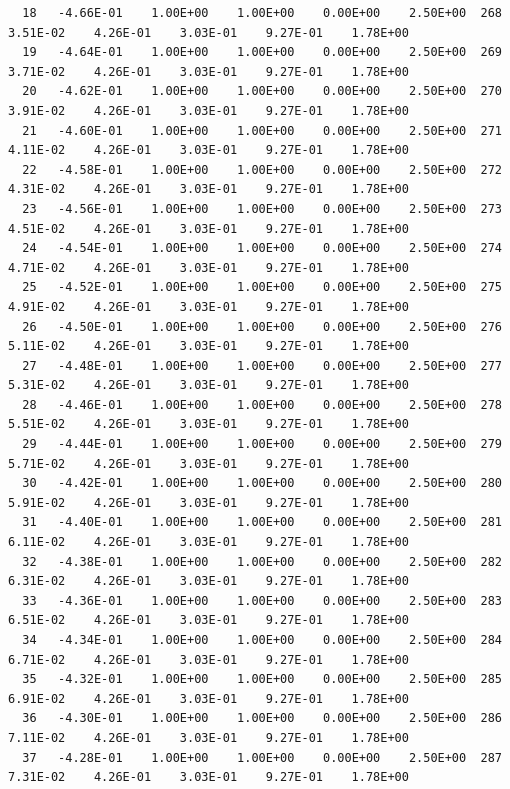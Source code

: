\documentclass[10pt,letterpaper,notitlepage]{article}
\numberwithin{equation}{section}
\begin{document}
\begin{appendices}
{\begin{verbatim}
  18   -4.66E-01    1.00E+00    1.00E+00    0.00E+00    2.50E+00  268    3.51E-02    4.26E-01    3.03E-01    9.27E-01    1.78E+00
  19   -4.64E-01    1.00E+00    1.00E+00    0.00E+00    2.50E+00  269    3.71E-02    4.26E-01    3.03E-01    9.27E-01    1.78E+00
  20   -4.62E-01    1.00E+00    1.00E+00    0.00E+00    2.50E+00  270    3.91E-02    4.26E-01    3.03E-01    9.27E-01    1.78E+00
  21   -4.60E-01    1.00E+00    1.00E+00    0.00E+00    2.50E+00  271    4.11E-02    4.26E-01    3.03E-01    9.27E-01    1.78E+00
  22   -4.58E-01    1.00E+00    1.00E+00    0.00E+00    2.50E+00  272    4.31E-02    4.26E-01    3.03E-01    9.27E-01    1.78E+00
  23   -4.56E-01    1.00E+00    1.00E+00    0.00E+00    2.50E+00  273    4.51E-02    4.26E-01    3.03E-01    9.27E-01    1.78E+00
  24   -4.54E-01    1.00E+00    1.00E+00    0.00E+00    2.50E+00  274    4.71E-02    4.26E-01    3.03E-01    9.27E-01    1.78E+00
  25   -4.52E-01    1.00E+00    1.00E+00    0.00E+00    2.50E+00  275    4.91E-02    4.26E-01    3.03E-01    9.27E-01    1.78E+00
  26   -4.50E-01    1.00E+00    1.00E+00    0.00E+00    2.50E+00  276    5.11E-02    4.26E-01    3.03E-01    9.27E-01    1.78E+00
  27   -4.48E-01    1.00E+00    1.00E+00    0.00E+00    2.50E+00  277    5.31E-02    4.26E-01    3.03E-01    9.27E-01    1.78E+00
  28   -4.46E-01    1.00E+00    1.00E+00    0.00E+00    2.50E+00  278    5.51E-02    4.26E-01    3.03E-01    9.27E-01    1.78E+00
  29   -4.44E-01    1.00E+00    1.00E+00    0.00E+00    2.50E+00  279    5.71E-02    4.26E-01    3.03E-01    9.27E-01    1.78E+00
  30   -4.42E-01    1.00E+00    1.00E+00    0.00E+00    2.50E+00  280    5.91E-02    4.26E-01    3.03E-01    9.27E-01    1.78E+00
  31   -4.40E-01    1.00E+00    1.00E+00    0.00E+00    2.50E+00  281    6.11E-02    4.26E-01    3.03E-01    9.27E-01    1.78E+00
  32   -4.38E-01    1.00E+00    1.00E+00    0.00E+00    2.50E+00  282    6.31E-02    4.26E-01    3.03E-01    9.27E-01    1.78E+00
  33   -4.36E-01    1.00E+00    1.00E+00    0.00E+00    2.50E+00  283    6.51E-02    4.26E-01    3.03E-01    9.27E-01    1.78E+00
  34   -4.34E-01    1.00E+00    1.00E+00    0.00E+00    2.50E+00  284    6.71E-02    4.26E-01    3.03E-01    9.27E-01    1.78E+00
  35   -4.32E-01    1.00E+00    1.00E+00    0.00E+00    2.50E+00  285    6.91E-02    4.26E-01    3.03E-01    9.27E-01    1.78E+00
  36   -4.30E-01    1.00E+00    1.00E+00    0.00E+00    2.50E+00  286    7.11E-02    4.26E-01    3.03E-01    9.27E-01    1.78E+00
  37   -4.28E-01    1.00E+00    1.00E+00    0.00E+00    2.50E+00  287    7.31E-02    4.26E-01    3.03E-01    9.27E-01    1.78E+00

\end{verbatim}}
\end{appendices}
\end{document}
